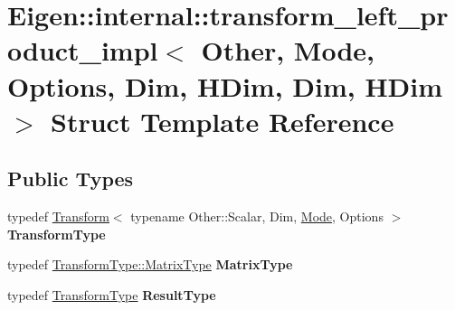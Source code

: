 \hypertarget{struct_eigen_1_1internal_1_1transform__left__product__impl_3_01_other_00_01_mode_00_01_options_037bfaa634250d504931892f5ae22fc66}{}\section{Eigen\+::internal\+::transform\+\_\+left\+\_\+product\+\_\+impl$<$ Other, Mode, Options, Dim, H\+Dim, Dim, H\+Dim $>$ Struct Template Reference}
\label{struct_eigen_1_1internal_1_1transform__left__product__impl_3_01_other_00_01_mode_00_01_options_037bfaa634250d504931892f5ae22fc66}
\subsection*{Public Types}
\begin{DoxyCompactItemize}
\item 
\mbox{\label{struct_eigen_1_1internal_1_1transform__left__product__impl_3_01_other_00_01_mode_00_01_options_037bfaa634250d504931892f5ae22fc66_a67ecefe2f033e5bd9b820e56edbfde4d}} 
typedef \mbox{\hyperlink{class_eigen_1_1_transform}{Transform}}$<$ typename Other\+::\+Scalar, Dim, \mbox{\hyperlink{struct_mode}{Mode}}, Options $>$ {\bfseries Transform\+Type}
\item 
\mbox{\label{struct_eigen_1_1internal_1_1transform__left__product__impl_3_01_other_00_01_mode_00_01_options_037bfaa634250d504931892f5ae22fc66_a2b4f5bb8620fd213e4ca2f9ab8b54dc0}} 
typedef \mbox{\hyperlink{class_eigen_1_1_transform_a30f72ba46abc2bb3c7fa919c1078fc9c}{Transform\+Type\+::\+Matrix\+Type}} {\bfseries Matrix\+Type}
\item 
\mbox{\label{struct_eigen_1_1internal_1_1transform__left__product__impl_3_01_other_00_01_mode_00_01_options_037bfaa634250d504931892f5ae22fc66_aff57292889c319d41e769b5933308f0e}} 
typedef \mbox{\hyperlink{class_eigen_1_1_transform}{Transform\+Type}} {\bfseries Result\+Type}
\end{DoxyCompactItemize}
